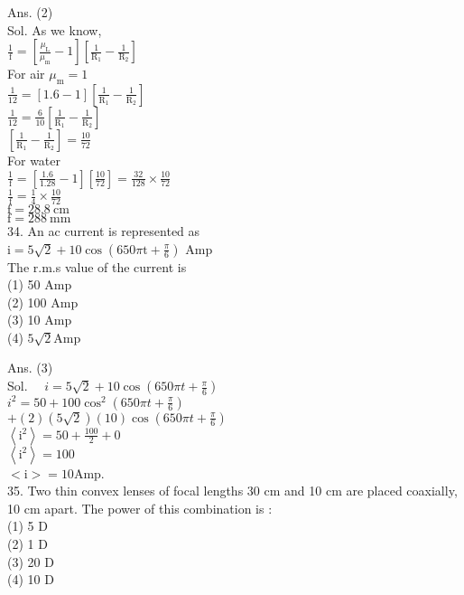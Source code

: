 \documentclass[10pt]{article}
\begin{document}
Ans. (2)\\
Sol. As we know,\\
\(\frac{1}{\mathrm{f}}=\left[\frac{\mu_{\mathrm{L}}}{\mu_{\mathrm{m}}}-1\right]\left[\frac{1}{\mathrm{R}_{1}}-\frac{1}{\mathrm{R}_{2}}\right]\)\\
For air \(\mu_{\mathrm{m}}=1\)\\
\(\frac{1}{12}=[1.6-1]\left[\frac{1}{\mathrm{R}_{1}}-\frac{1}{\mathrm{R}_{2}}\right]\)\\
\(\frac{1}{12}=\frac{6}{10}\left[\frac{1}{\mathrm{R}_{1}}-\frac{1}{\mathrm{R}_{2}}\right]\)\\
\(\left[\frac{1}{\mathrm{R}_{1}}-\frac{1}{\mathrm{R}_{2}}\right]=\frac{10}{72}\)\\
For water\\
\(\frac{1}{\mathrm{f}}=\left[\frac{1.6}{1.28}-1\right]\left[\frac{10}{72}\right]=\frac{32}{128} \times \frac{10}{72}\)\\
\(\frac{1}{\mathrm{f}}=\frac{1}{4} \times \frac{10}{72}\)\\
\(\mathrm{f}=28.8 \mathrm{~cm}\)\\
\(\mathrm{f}=288 \mathrm{~mm}\)\\
34. An ac current is represented as\\
\(\mathrm{i}=5 \sqrt{2}+10 \cos \left(650 \pi \mathrm{t}+\frac{\pi}{6}\right)\) Amp\\
The r.m.s value of the current is\\
(1) 50 Amp\\
(2) 100 Amp\\
(3) 10 Amp\\
(4) \(5 \sqrt{2} \mathrm{Amp}\)

Ans. (3)\\
Sol. \(\quad i=5 \sqrt{2}+10 \cos \left(650 \pi t+\frac{\pi}{6}\right)\)\\
\(i^{2}=50+100 \cos ^{2}\left(650 \pi t+\frac{\pi}{6}\right)\)\\
\(+(2)(5 \sqrt{2})(10) \cos \left(650 \pi t+\frac{\pi}{6}\right)\)\\
\(\left\langle\mathrm{i}^{2}\right\rangle=50+\frac{100}{2}+0\)\\
\(\left\langle\mathrm{i}^{2}\right\rangle=100\)\\
\(<\mathrm{i}>=10 \mathrm{Amp}\).\\
35. Two thin convex lenses of focal lengths 30 cm and 10 cm are placed coaxially, 10 cm apart. The power of this combination is :\\
(1) 5 D\\
(2) 1 D\\
(3) 20 D\\
(4) 10 D
\end{document}
